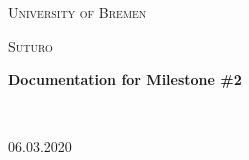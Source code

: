 \documentclass[12pt,a4paper]{report}%
\begin{document}
\begin{titlepage}

{
	\centering
	{\scshape\LARGE University of Bremen \par}
	\vspace{1cm}
	{\scshape\Large Suturo \par}
	\vspace{1.5cm}
	{\huge\bfseries Documentation for Milestone \#2 \par}
	\vspace{2cm}
	\hfill
	\\
	{06.03.2020 \par}
}

\end{titlepage}

\tableofcontents













\end{document}
